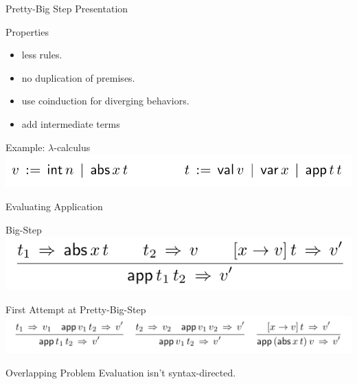 \documentclass[page number,dvipsnames]{beamer}
\begin{document}
\begin{frame}{Pretty-Big Step Presentation}
  \begin{exampleblock}{Properties}
    \begin{itemize}
    \item less rules.
    \item no duplication of premises.
    \item use coinduction for diverging behaviors.
    \item add intermediate terms
    \end{itemize}
  \end{exampleblock}
  \vfill
  \begin{block}{Example: $\lambda$-calculus}
    \center
    \includegraphics[scale=0.3]{lambda.png}
  \end{block}
\end{frame}

\begin{frame}{Evaluating Application}
  \begin{alertblock}{Big-Step}
    \center
    \includegraphics[scale=0.3]{bigstep_betared.png}
  \end{alertblock}
  \vfill
  \begin{block}{First Attempt at Pretty-Big-Step}
    \center
    \includegraphics[scale=0.3]{first_attempt_betared.png}
  \end{block}
  \begin{alertblock}{Overlapping Problem}
    Evaluation isn't syntax-directed.
  \end{alertblock}
\end{frame}
\end{document}
